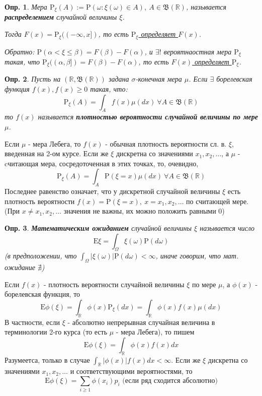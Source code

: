 \documentclass[12pt]{article}
\newtheorem{definition}{Опр.}
\theoremstyle{basic_theorem}
\theoremstyle{name_theorem}
\newcommand\defin[1]{\textbf{#1}}
\def\R{
    \mathbb{R}
}
\def\E{
    \mathrm{E}
}
\def\P{
    \mathrm{P}
}
\def\B{
    \mathfrak{B}
}
\begin{document}
\begin{definition}
    Мера $\P_\xi(A) := \P(\omega: \xi(\omega) \in A), \ A \in \B(\R)$,
    называется \defin{распределением} случайной величины $\xi$.

    Тогда $F(x) = \P_\xi((-\infty, x])$, то есть \underline{$\P_\xi$ определяет $F(x)$}.
    
    Обратно: $\P (\alpha < \xi \leq \beta) = F(\beta) - F(\alpha)$, 
    и $\exists!$ вероятнаостная мера $\P_\xi$ такая, что
    $\P_\xi((\alpha, \beta]) = F(\beta) - F(\alpha)$, то есть \underline{$F(x)$ определяет $\P_\xi$}.
\end{definition}
\begin{definition}
    Пусть на $(\R, \B(\R))$ задана $\sigma$-конечная мера $\mu$.
    Если $\exists$ борелевская функция $f(x), f(x) \geq 0$ такая, что:
     $$\P_\xi(A) = \int_Af(x)\mu(dx) \ \forall A \in \B(\R)$$
    то $f(x)$ называется \defin{плотностью вероятности случайной величины по мере $\mu$}.
\end{definition}
Если $\mu$ - мера Лебега, то $f(x)$ - обычная плотность вероятности сл. в. $\xi$,
введенная на 2-ом курсе. Если же $\xi$ дискретна со значениями $x_1, x_2, \ldots$,
а $\mu$ - cчитающая мера, сосредоточенная в этих точках, то, очевидно,
$$\P_\xi(A) = \int_A \P(\xi = x)\mu(dx) \ \forall A \in \B(\R)$$
Последнее равенство означает, что у дискретной случайной величины $\xi$
есть плотность вероятности $f(x) = \P(\xi = x), \ x = x_1, x_2, \ldots$
по считающей мере. (При $ x \neq x_1, x_2, \ldots$ значения не важны, их
можно положить равными 0)
\begin{definition}
    \defin{Математическим ожиданием} случайной величины $\xi$ называется число
    $$\E\xi = \int_\Omega \xi(\omega)\P(d\omega)$$
    (в предположении, что $\int_\Omega |\xi(\omega)| \P(d\omega) < \infty$,
    иначе говорим, что мат. ожидание $\nexists$)
\end{definition}
    Если $f(x)$ - плотность вероятности случайной величины $\xi$ по мере $\mu$,
    а $\phi(x)$ - борелевская функция, то
    $$\E\phi(\xi) = \int_\R\phi(x)\P_\xi(dx) = \int_\R\phi(x)f(x)\mu(dx)$$
    В частности, если $\xi$ - абсолютно непрерывная случайная величина в
    терминологии 2-го курса (то есть $\mu$ - мера Лебега), то пишем
    $$\E\phi(\xi) = \int_\R\phi(x)f(x)dx$$
    Разумеетса, только в случае $\int_\R|\phi(x)|f(x)dx < \infty$.
    Если же $\xi$ дискретна со значениями $x_1, x_2, \ldots$ и соответствующими
    вероятностями, то 
    $$\E\phi(\xi) = \sum_{i \geq 1} \phi(x_i)p_i \mbox{ (если ряд сходится абсолютно)}$$
\end{document}
